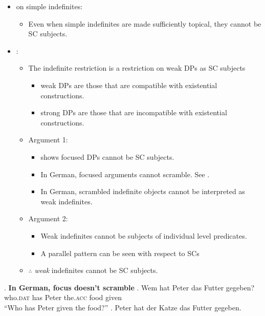 \documentclass[GPFinal]{subfiles}
\begin{document}
\begin{itemize}
  \item \textcite{mikkelsen2004specifying} on simple indefinites:
    \begin{itemize}
      \item Even when simple indefinites are made sufficiently topical, they cannot be SC subjects.
    \end{itemize}
  \item \textcite{heycock2012specification}:
    \begin{itemize}
      \item The indefinite restriction is a restriction on weak DPs as SC subjects
	\begin{itemize}
	  \item weak DPs are those that are compatible with existential constructions. \textcite{milsark1974existential}
	  \item strong DPs are those that are incompatible with existential constructions.
	\end{itemize}
      \item Argument 1:
	\begin{itemize}
	  \item \Last shows focused DPs cannot be SC subjects.
	  \item In German, focused arguments cannot scramble. See \Next[b]. \parencite{lenerz1977zur}
	  \item In German, scrambled indefinite objects cannot be interpreted as weak indefinites. \parencite{dehoop1992case,diesing1992indefinites}
	\end{itemize}
      \item Argument 2:
	\begin{itemize}
	  \item Weak indefinites cannot be subjects of individual level predicates. \parencite{milsark1974existential}
	  \item A parallel pattern can be seen with respect to SCs
	\end{itemize}
      \item $\therefore$ \textit{weak} indefinites cannot be SC subjects.
    \end{itemize}
\end{itemize}
\ex. \textbf{In German, focus doesn't scramble}
  \ag. Wem hat Peter das Futter gegeben?\\
who.\textsc{dat} has Peter the.\textsc{acc} food given\\
``Who has Peter given the food?''
    \ag. Peter hat der Katze das Futter gegeben.\\
\end{document}
